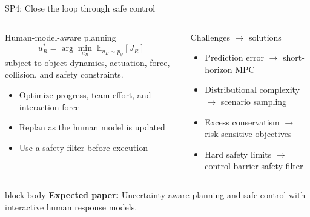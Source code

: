 \documentclass[aspectratio=169,11pt]{beamer}
\newcommand{\paperout}[1]{%
  \begin{beamercolorbox}[rounded=true,sep=0.55em,wd=\linewidth]{block body}
    \footnotesize\textbf{Expected paper:} #1
  \end{beamercolorbox}}
\begin{document}
\begin{frame}{SP4: Close the loop through safe control}
\footnotesize
\begin{columns}[T,onlytextwidth]
\begin{block}{Human-model-aware planning}
\[
u_R^*=\arg\min_{u_R}\;\mathbb{E}_{u_H\sim p_\psi}[J_R]
\]
subject to object dynamics, actuation, force, collision, and safety constraints.
\begin{itemize}
  \item Optimize progress, team effort, and interaction force
  \item Replan as the human model is updated
  \item Use a safety filter before execution
\end{itemize}
\end{block}
\begin{alertblock}{Challenges $\rightarrow$ solutions}
\begin{itemize}
  \item Prediction error $\rightarrow$ short-horizon MPC
  \item Distributional complexity $\rightarrow$ scenario sampling
  \item Excess conservatism $\rightarrow$ risk-sensitive objectives
  \item Hard safety limits $\rightarrow$ control-barrier safety filter
\end{itemize}
\end{alertblock}
\end{columns}
\vspace{0.15cm}
\paperout{Uncertainty-aware planning and safe control with interactive human response models.}
\end{frame}
\end{document}
